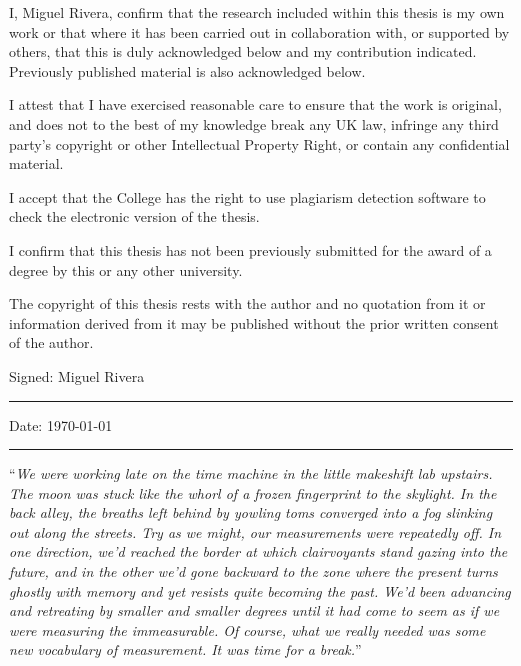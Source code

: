 \documentclass[
11pt, %
english, %
singlespacing, %
headsepline, %
]{MastersDoctoralThesis} %
\begin{document}

\begin{declaration}
\addchaptertocentry{\authorshipname} %
\noindent I, Miguel Rivera, confirm that the research included within this thesis is my own work or that where it has been carried out in collaboration with, or supported by others, that this is duly acknowledged below and my contribution indicated. Previously published material is also acknowledged below.

I attest that I have exercised reasonable care to ensure that the work is original, and does not to the best of my knowledge break any UK law, infringe any third party’s copyright or other Intellectual Property Right, or contain any confidential material.

I accept that the College has the right to use plagiarism detection software to check the electronic version of the thesis.

I confirm that this thesis has not been previously submitted for the award of a degree by this or any other university.

The copyright of this thesis rests with the author and no quotation from it or information derived from it may be published without the prior written consent of the author.

 
\noindent Signed: Miguel Rivera\\
\rule[0.5em]{25em}{0.5pt} %
 
\noindent Date: \today\\
\rule[0.5em]{25em}{0.5pt} %
\end{declaration}

\cleardoublepage


\vspace*{0.2\textheight}

\noindent\enquote{\itshape We were working late on the time machine in the little makeshift lab upstairs. The moon was stuck like the whorl of a frozen fingerprint to the skylight. In the back alley, the breaths left behind by yowling toms converged into a fog slinking out along the streets. Try as we might, our measurements were repeatedly off. In one direction, we'd reached the border at which clairvoyants stand gazing into the future, and in the other we'd gone backward to the zone where the present turns ghostly with memory and yet resists quite becoming the past. We'd been advancing and retreating by smaller and smaller degrees until it had come to seem as if we were measuring the immeasurable. Of course, what we really needed was some new vocabulary of measurement. It was time for a break.}\bigbreak
\end{document}
